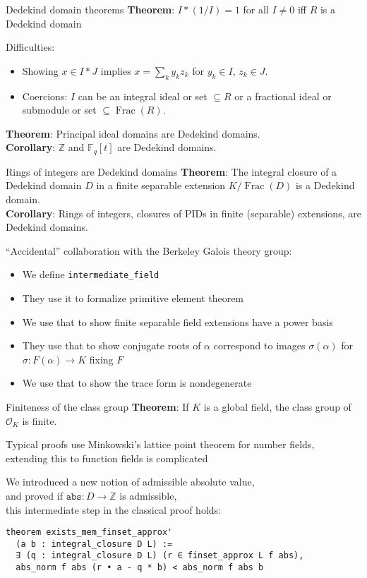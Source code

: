 \documentclass{beamer}
\newcommand{\lean}[1]{\texttt{#1}\xspace}
\newcommand*{\OK}[1][K]{\mathcal{O}_{#1}}
\newcommand*{\Fq}[1][q]{\mathbb{F}_{#1}}
\newcommand{\Z}{\mathbb{Z}}
\DeclareMathOperator{\Frac}{Frac}
\begin{document}
\begin{frame}{Dedekind domain theorems}
	\textbf{Theorem}: $I * (1 / I) = 1$ for all $I \ne 0$ iff $R$ is a Dedekind domain

	Difficulties:
	\begin{itemize}
		\item Showing $x \in I * J$ implies $x = \sum_k y_k z_k$ for $y_k \in I$, $z_k \in J$.
		\item Coercions: $I$ can be an integral ideal or set $\subseteq R$ or a fractional ideal or submodule or set $\subseteq \Frac(R)$.
	\end{itemize}

\pause
	\textbf{Theorem}: Principal ideal domains are Dedekind domains.\\
	\textbf{Corollary}: $\Z$ and $\Fq[q][t]$ are Dedekind domains.
\end{frame}

\begin{frame}{Rings of integers are Dedekind domains}
	\textbf{Theorem}: The integral closure of a Dedekind domain $D$ in a finite separable extension $K / \Frac(D)$ is a Dedekind domain.\\
	\textbf{Corollary}: Rings of integers, closures of PIDs in finite (separable) extensions, are Dedekind domains.

\pause
	``Accidental'' collaboration with the Berkeley Galois theory group:
	\begin{itemize}
		\setlength\itemsep{-0.5\baselineskip}
		\item We define \lean{intermediate\_field}
		\item They use it to formalize primitive element theorem
		\item We use that to show finite separable field extensions have a power basis
		\item They use that to show conjugate roots of $\alpha$ correspond to images $\sigma(\alpha)$ for $\sigma : F(\alpha) \to K$ fixing $F$
		\item We use that to show the \alert{trace form} is nondegenerate
	\end{itemize}
\end{frame}

\begin{frame}[fragile]{Finiteness of the class group}
	\textbf{Theorem}: If $K$ is a global field, the class group of $\OK$ is finite.

	Typical proofs use Minkowski's lattice point theorem for number fields,\\
	extending this to function fields is complicated

\pause
	We introduced a new notion of \alert{admissible absolute value},\\
	and proved if $\lean{abs} : D \to \Z$ is admissible,\\
	this intermediate step in the classical proof holds:
\begin{lstlisting}
theorem exists_mem_finset_approx'
  (a b : integral_closure D L) :=
  ∃ (q : integral_closure D L) (r ∈ finset_approx L f abs),
  abs_norm f abs (r • a - q * b) < abs_norm f abs b
\end{lstlisting}
\end{frame}
\end{document}
